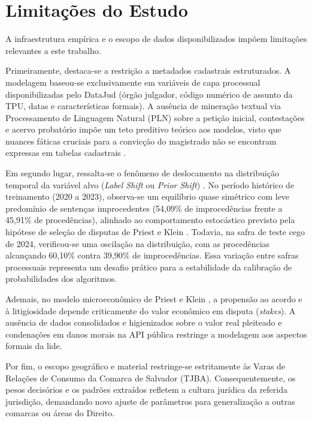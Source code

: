 \documentclass[conference]{IEEEtran}
\begin{document}
\section{Limitações do Estudo}
A infraestrutura empírica e o escopo de dados disponibilizados impõem limitações relevantes a este trabalho.

Primeiramente, destaca-se a restrição a metadados cadastrais estruturados. A modelagem baseou-se exclusivamente em variáveis de capa processual disponibilizadas pelo DataJud (órgão julgador, código numérico de assunto da TPU, datas e características formais). A ausência de mineração textual via Processamento de Linguagem Natural (PLN) sobre a petição inicial, contestações e acervo probatório impõe um teto preditivo teórico aos modelos, visto que nuances fáticas cruciais para a convicção do magistrado não se encontram expressas em tabelas cadastrais \cite{bertalan2020}.

Em segundo lugar, ressalta-se o fenômeno de deslocamento na distribuição temporal da variável alvo (\textit{Label Shift} ou \textit{Prior Shift}) \cite{izbicki2020}. No período histórico de treinamento (2020 a 2023), observa-se um equilíbrio quase simétrico com leve predomínio de sentenças improcedentes (54,09\% de improcedências frente a 45,91\% de procedências), alinhado ao comportamento estocástico previsto pela hipótese de seleção de disputas de Priest e Klein \cite{priest1984}. Todavia, na safra de teste cego de 2024, verificou-se uma oscilação na distribuição, com as procedências alcançando 60,10\% contra 39,90\% de improcedências. Essa variação entre safras processuais representa um desafio prático para a estabilidade da calibração de probabilidades dos algoritmos.

Ademais, no modelo microeconômico de Priest e Klein \cite{priest1984}, a propensão ao acordo e à litigiosidade depende criticamente do valor econômico em disputa (\textit{stakes}). A ausência de dados consolidados e higienizados sobre o valor real pleiteado e condenações em danos morais na API pública restringe a modelagem aos aspectos formais da lide.

Por fim, o escopo geográfico e material restringe-se estritamente às Varas de Relações de Consumo da Comarca de Salvador (TJBA). Consequentemente, os pesos decisórios e os padrões extraídos refletem a cultura jurídica da referida jurisdição, demandando novo ajuste de parâmetros para generalização a outras comarcas ou áreas do Direito.

\end{document}
